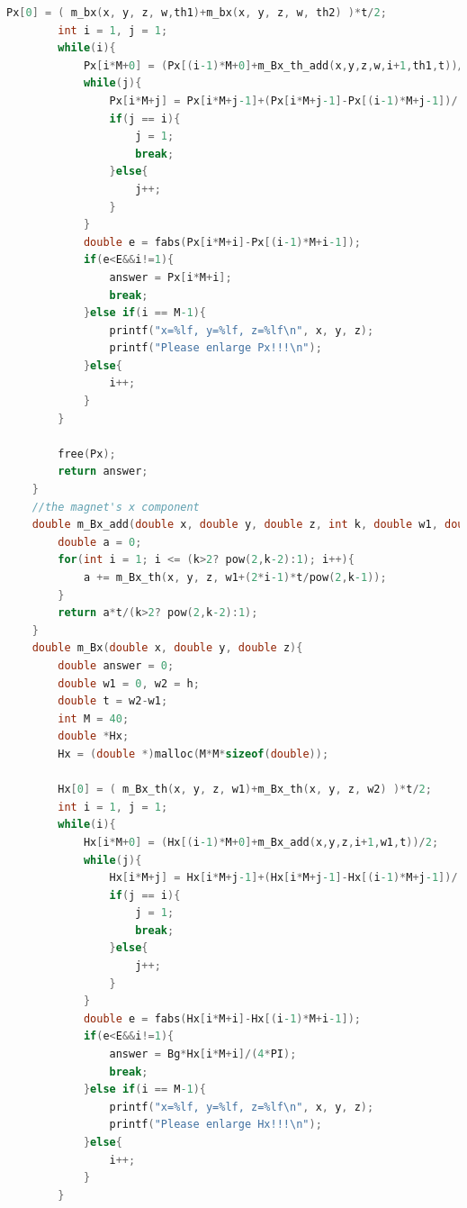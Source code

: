 \documentclass[AutoFakeBold]{LZUThesis}
\begin{document}
\begin{lstlisting}[language = C]
        Px[0] = ( m_bx(x, y, z, w,th1)+m_bx(x, y, z, w, th2) )*t/2;
        int i = 1, j = 1;
        while(i){
            Px[i*M+0] = (Px[(i-1)*M+0]+m_Bx_th_add(x,y,z,w,i+1,th1,t))/2;
            while(j){
                Px[i*M+j] = Px[i*M+j-1]+(Px[i*M+j-1]-Px[(i-1)*M+j-1])/(pow(4,j)-1);
                if(j == i){
                    j = 1;
                    break;
                }else{
                    j++;
                }
            }
            double e = fabs(Px[i*M+i]-Px[(i-1)*M+i-1]);
            if(e<E&&i!=1){
                answer = Px[i*M+i];
                break;
            }else if(i == M-1){
                printf("x=%lf, y=%lf, z=%lf\n", x, y, z);
                printf("Please enlarge Px!!!\n");
            }else{
                i++;
            }
        }
    
        free(Px);
        return answer;
    }
    //the magnet's x component
    double m_Bx_add(double x, double y, double z, int k, double w1, double t){
        double a = 0;
        for(int i = 1; i <= (k>2? pow(2,k-2):1); i++){
            a += m_Bx_th(x, y, z, w1+(2*i-1)*t/pow(2,k-1));
        }
        return a*t/(k>2? pow(2,k-2):1);
    }
    double m_Bx(double x, double y, double z){
        double answer = 0;
        double w1 = 0, w2 = h;
        double t = w2-w1;
        int M = 40;
        double *Hx;
        Hx = (double *)malloc(M*M*sizeof(double));
    
        Hx[0] = ( m_Bx_th(x, y, z, w1)+m_Bx_th(x, y, z, w2) )*t/2;
        int i = 1, j = 1;
        while(i){
            Hx[i*M+0] = (Hx[(i-1)*M+0]+m_Bx_add(x,y,z,i+1,w1,t))/2;
            while(j){
                Hx[i*M+j] = Hx[i*M+j-1]+(Hx[i*M+j-1]-Hx[(i-1)*M+j-1])/(pow(4,j)-1);
                if(j == i){
                    j = 1;
                    break;
                }else{
                    j++;
                }
            }
            double e = fabs(Hx[i*M+i]-Hx[(i-1)*M+i-1]);
            if(e<E&&i!=1){
                answer = Bg*Hx[i*M+i]/(4*PI);
                break;
            }else if(i == M-1){
                printf("x=%lf, y=%lf, z=%lf\n", x, y, z);
                printf("Please enlarge Hx!!!\n");
            }else{
                i++;
            }
        }
    

\end{lstlisting}
\end{document}

